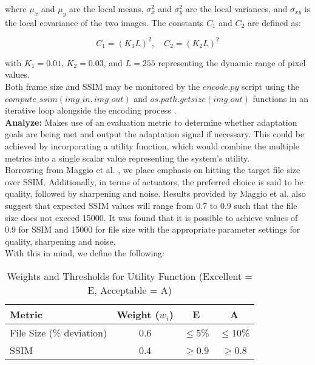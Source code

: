 \documentclass[conference]{IEEEtran}
\begin{document}
where \( \mu_x \) and \( \mu_y \) are the local means, \( \sigma_x^2 \) and \( \sigma_y^2 \) are the local variances, and \( \sigma_{xy} \) is the local covariance of the two images. The constants \( C_1 \) and \( C_2 \) are defined as:

\[
	C_1 = (K_1 L)^2, \quad C_2 = (K_2 L)^2
\]

with \( K_1 = 0.01 \), \( K_2 = 0.03 \), and \( L = 255 \) representing the dynamic range of pixel values.\\

\noindent Both frame size and SSIM may be monitored by the $encode.py$ script using the $compute\_ssim(img\_in, img\_out)$ and $os.path.getsize(img\_out)$ functions in an iterative loop alongside the encoding process \cite{SAVE_pdf}.\\

\noindent \textbf{Analyze:} Makes use of an evaluation metric to determine whether adaptation goals are being met and output the adaptation signal if necessary. This could be achieved by incorporating a utility function, which would combine the multiple metrics into a single scalar value representing the system's utility.\\

\noindent Borrowing from Maggio et al. \cite{SAVE_pdf}, we place emphasis on hitting the target file size over SSIM. Additionally, in terms of actuators, the preferred choice is said to be quality, followed by sharpening and noise. Results provided by Maggio et al. also suggest that expected SSIM values will range from 0.7 to 0.9 such that the file size does not exceed 15000. It was found that it is possible to achieve values of 0.9 for SSIM and 15000 for file size with the appropriate parameter settings for quality, sharpening and noise.\\

\noindent With this in mind, we define the following:

\begin{table}[ht]
	\centering
	\caption{Weights and Thresholds for Utility Function (Excellent = E, Acceptable = A)}
	\label{tab:adaptation-weights}
	\small
	\begin{tabular}{lccc}
		\toprule
		\textbf{Metric}          & \textbf{Weight ($w_i$)} & \textbf{E} & \textbf{A} \\
		\midrule
		File Size (\% deviation) & 0.6                     & $\leq$5\%  & $\leq$10\% \\
		SSIM                     & 0.4                     & $\geq$0.9  & $\geq$0.8  \\
		\bottomrule
	\end{tabular}
\end{table}
\end{document}
